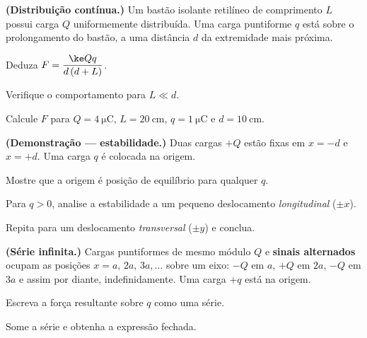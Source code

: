 \begin{questao}[4]{}

\textbf{(Distribuição contínua.)} Um bastão isolante retilíneo de comprimento
$L$ possui carga $Q$ uniformemente distribuída. Uma carga puntiforme $q$ está
sobre o prolongamento do bastão, a uma distância $d$ da extremidade mais
próxima.
\begin{itensq}
\item Deduza $F=\dfrac{\ke Qq}{d\,(d+L)}$.
\item Verifique o comportamento para $L\ll d$.
\item Calcule $F$ para $Q=\SI{4}{\micro\coulomb}$, $L=\SI{20}{\centi\meter}$,
      $q=\SI{1}{\micro\coulomb}$ e $d=\SI{10}{\centi\meter}$.
\end{itensq}


\end{questao}
\begin{questao}[4]{}

\textbf{(Demonstração --- estabilidade.)} Duas cargas $+Q$ estão fixas em
$x=-d$ e $x=+d$. Uma carga $q$ é colocada na origem.
\begin{itensq}
\item Mostre que a origem é posição de equilíbrio para qualquer $q$.
\item Para $q>0$, analise a estabilidade a um pequeno deslocamento
      \emph{longitudinal} ($\pm x$).
\item Repita para um deslocamento \emph{transversal} ($\pm y$) e conclua.
\end{itensq}


\end{questao}
\begin{questao}[4]{}

\textbf{(Série infinita.)} Cargas puntiformes de mesmo módulo $Q$ e
\textbf{sinais alternados} ocupam as posições $x=a,\,2a,\,3a,\dots$ sobre um
eixo: $-Q$ em $a$, $+Q$ em $2a$, $-Q$ em $3a$ e assim por diante,
indefinidamente. Uma carga $+q$ está na origem.
\begin{itensq}
\item Escreva a força resultante sobre $q$ como uma série.
\item Some a série e obtenha a expressão fechada.
\end{itensq}


\end{questao}
